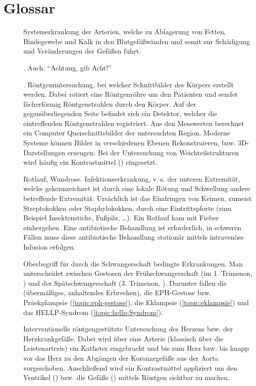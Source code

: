 
\chapter{Glossar}

\begin{description}
  \item[] Systemerkrankung der
  Arterien, welche zu Ablagerung von Fetten, Bindegewebe und Kalk in
  den Blutgefäßwänden und somit zur Schädigung und
  Veränderungen der Gefäßen führt.
  \item[]    . Auch: \enquote{Achtung, gib Acht!}
  \item[]  .
  Röntgenuntersuchung, bei welcher Schnittbilder des
  Körpers erstellt werden. Dabei rotiert  eine
  Röntgenröhre um den Patienten und sendet
  fächerförmig Röntgenstrahlen durch den Körper. Auf der
  gegenüberliegenden Seite  befindet sich ein Detektor,
  welcher die eintreffenden Röntgenstrahlen registriert. Aus
  den Messwerten berechnet ein Computer
  Querschnittsbilder der untersuchten Region. Moderne
  Systeme können Bilder in verschiedenen Ebenen
  Rekonstruieren, bzw. 3D-Darstellungen erzeugen. Bei der
  Untersuchung von Weichteilstrukturen wird häufig ein
  Kontrastmittel ()
  eingesetzt.
  \item[]  Rotlauf, Wundrose. \label{topic:erysipel}
  Infektionserkrankung, v.\,a. der unteren Extremität, welche
  gekennzeichnet ist durch eine lokale Rötung und Schwellung 
  andere betreffende Extremität. Ursächlich ist das
  Eindringen von Keimen, zumeist Streptokokken oder
  Staphylokokken, durch eine Eintrittspforte (zum Beispiel
  Insektenstiche, Fußpilz, \ldots). Ein Rotlauf kam mit 
  Fieber einhergehen. Eine antibiotische Behandlung ist
   erforderlich, in schweren Fällen muss diese
  antibiotische Behandlung stationär mittels intravenöse
  Infusion erfolgen.
  \item[] Oberbegriff für durch die
  Schwangerschaft bedingte Erkrankungen. Man unterscheidet
  zwischen Gestosen der Frühschwangerschaft (im
  1. Trimenon, ) und der Spätschwangerschaft
  (3. Trimenon, ). Darunter fallen die
   (übermäßiges, anhaltendes
  Erbrechen), die EPH-Gestose bzw. Präekplampsie
  (\ref{topic:eph-gestose}), die Eklampsie
  (\ref{topic:eklampsie}) und das HELLP-Syndrom
  (\ref{topic:hellp-Syndrom}).
  \item[]
  \label{topic:Herzkatheteruntersuchung} Interventionelle
  röntgengestützte Untersuchung des Herzens bzw. der
  Herzkrankgefäße. Dabei wird über eine Arterie
  (klassisch über die Leistenarterie) ein Katheter
  eingebracht und bis zum Herz bzw. bis knapp vor das Herz
  zu den Abgängen der Koronargefäße aus der Aorta vorgeschoben.
  Anschließend wird ein Kontrastmittel appliziert um den
  Ventrikel () bzw. die Gefäße
  () mittels Röntgen sichtbar zu
  machen.
  

\end{description}
